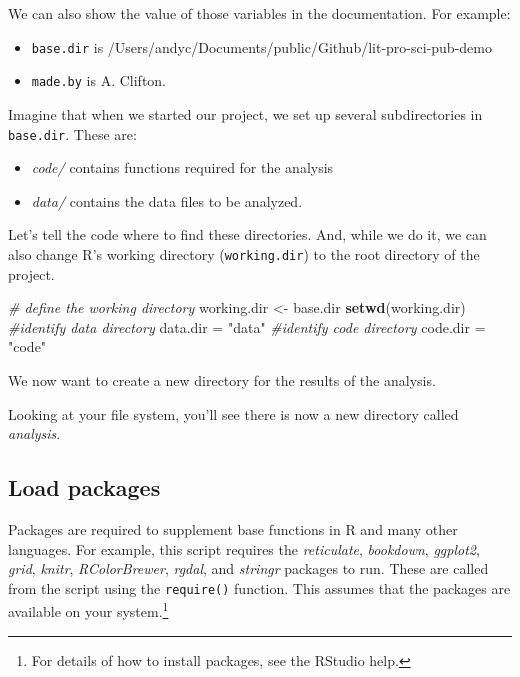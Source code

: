 \documentclass[11pt,]{article}
\newenvironment{Shaded}{\begin{snugshade}}{\end{snugshade}}
\newcommand{\CommentTok}[1]{\textcolor[rgb]{0.56,0.35,0.01}{\textit{#1}}}
\newcommand{\KeywordTok}[1]{\textcolor[rgb]{0.13,0.29,0.53}{\textbf{#1}}}
\newcommand{\NormalTok}[1]{#1}
\newcommand{\StringTok}[1]{\textcolor[rgb]{0.31,0.60,0.02}{#1}}
\providecommand{\tightlist}{%
  \setlength{\itemsep}{0pt}\setlength{\parskip}{0pt}}
\let\rmarkdownfootnote\footnote%
\def\footnote{\protect\rmarkdownfootnote}
\begin{document}
We can also show the value of those variables in the documentation. For example:

\begin{itemize}
\tightlist
\item
  \texttt{base.dir} is /Users/andyc/Documents/public/Github/lit-pro-sci-pub-demo
\item
  \texttt{made.by} is A. Clifton.
\end{itemize}

Imagine that when we started our project, we set up several subdirectories in \texttt{base.dir}. These are:

\begin{itemize}
\tightlist
\item
  \emph{code/} contains functions required for the analysis
\item
  \emph{data/} contains the data files to be analyzed.
\end{itemize}

Let's tell the code where to find these directories. And, while we do it, we can also change R's working directory (\texttt{working.dir}) to the root directory of the project.

\begin{Shaded}
\begin{Highlighting}[]
\CommentTok{# define the working directory}
\NormalTok{working.dir <-}\StringTok{ }\NormalTok{base.dir}
\KeywordTok{setwd}\NormalTok{(working.dir)}
\CommentTok{#identify data directory}
\NormalTok{data.dir =}\StringTok{ "data"}
\CommentTok{#identify code directory}
\NormalTok{code.dir =}\StringTok{ "code"}
\end{Highlighting}
\end{Shaded}

We now want to create a new directory for the results of the analysis.

Looking at your file system, you'll see there is now a new directory called \emph{analysis}.

\hypertarget{load-packages}{%
\subsection{Load packages}\label{load-packages}}

Packages are required to supplement base functions in R and many other languages. For example, this script requires the \emph{reticulate}, \emph{bookdown}, \emph{ggplot2}, \emph{grid}, \emph{knitr}, \emph{RColorBrewer}, \emph{rgdal}, and \emph{stringr} packages to run. These are called from the script using the \texttt{require()} function. This assumes that the packages are available on your system.\footnote{For details of how to install packages, see the RStudio help.}
\end{document}
